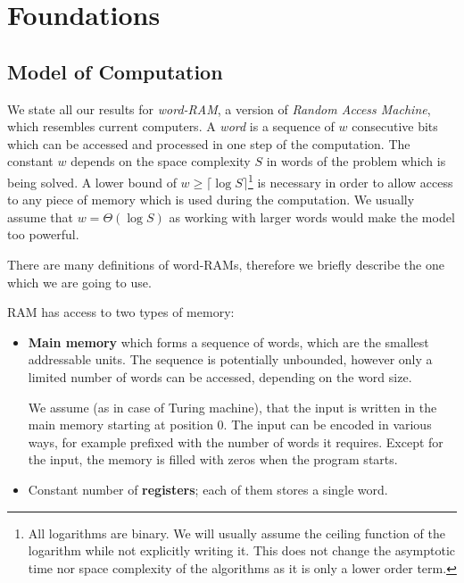 \chapter{Foundations}

\section{Model of Computation}

We state all our results for \emph{word-RAM}, a version of \emph{Random Access Machine}, which resembles current computers.
A \emph{word} is a sequence of $w$ consecutive bits which can be accessed and processed in one step of the computation.
The constant $w$ depends on the space complexity $S$ in words of the problem which is being solved.
A lower bound of $w \ge \lceil \log S \rceil$\footnote{
	All logarithms are binary. 
	We will usually assume the ceiling function of the logarithm while not explicitly writing it.
	This does not change the asymptotic time nor space complexity of the algorithms as it is only a lower order term.
}
 is necessary in order to allow access to any piece of memory which is used during the computation.
We usually assume that $w = \Theta(\log S)$ as working with larger words would make the model too powerful.

\bigbreak

There are many definitions of word-RAMs, therefore we briefly describe the one which we are going to use.

RAM has access to two types of memory:
\begin{itemize}
	\item \textbf{Main memory} which forms a sequence of words, which are the smallest addressable units.
	The sequence is potentially unbounded, however only a limited number of words can be accessed, depending on the word size.
	
	We assume (as in case of Turing machine), that the input is written in the main memory starting at position $0$.
	The input can be encoded in various ways, for example prefixed with the number of words it requires.
	Except for the input, the memory is filled with zeros when the program starts.
	
	\item Constant number of \textbf{registers}; each of them stores a single word.
\end{itemize}

